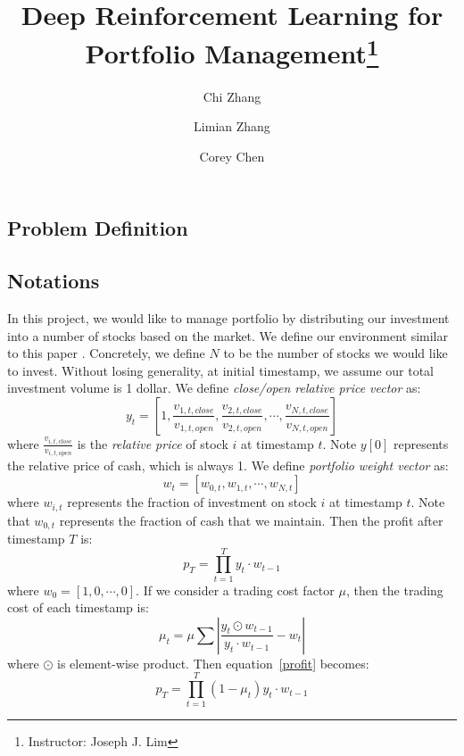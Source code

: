 \documentclass[a4paper, 10pt]{article}
\title{\textbf{Deep Reinforcement Learning for Portfolio Management}\thanks{Instructor: Joseph J. Lim}}
\author[]{Chi Zhang}
\author[]{Limian Zhang}
\author[]{Corey Chen}
\affil[]{Department of Computer Science}
\begin{document}
  \maketitle                     %
  \begin{spacing}{1.2}
    \section{Problem Definition}
    \subsection{Notations}
    In this project, we would like to manage portfolio by distributing our investment into a number of stocks based on the market. We define our environment similar to this paper \cite{DBLP:journals/corr/JiangXL17}.
    Concretely, we define $N$ to be the number of stocks we would like to invest.
    Without losing generality, at initial timestamp, we assume our total investment volume is 1 dollar. We define \emph{close/open relative price vector} as:
    \begin{equation}
    y_t=[1, \frac{v_{1,t, close}}{v_{1,t, open}}, \frac{v_{2,t, close}}{v_{2,t, open}},\cdots,\frac{v_{N,t,close}}{v_{N,t, open}}]
    \end{equation}
    where $\frac{v_{i, t, close}}{v_{i, t, open}}$ is the \emph{relative price} of stock $i$ at timestamp $t$. 
    Note $y[0]$ represents the relative price of cash, which is always 1. We define \emph{portfolio weight vector} as:
    \begin{equation}
    w_t=[w_{0,t}, w_{1, t}, \cdots, w_{N, t}]
    \end{equation}
    where $w_{i,t}$ represents the fraction of investment on stock $i$ at timestamp $t$. Note that $w_{0,t}$ represents the fraction of cash that we maintain. Then the profit after timestamp $T$ is:
    \begin{equation}
    \label{profit}
    p_T=\prod_{t=1}^{T}y_t\cdot w_{t-1}
    \end{equation}
    where $w_0=[1, 0, \cdots, 0]$. If we consider a trading cost factor $\mu$, then the trading cost of each timestamp is:
    \begin{equation}
    {\mu}_t=\mu\sum{|\frac{y_t \odot w_{t-1}}{y_t \cdot w_{t-1}} - w_{t}|}
    \end{equation}
    where $\odot$ is element-wise product. Then equation~\ref{profit} becomes:
    \begin{equation}
    \label{profit_mu}
    p_T=\prod_{t=1}^{T}(1-\mu_t) y_t\cdot w_{t-1}
    \end{equation}
    

\end{spacing}
\end{document}
